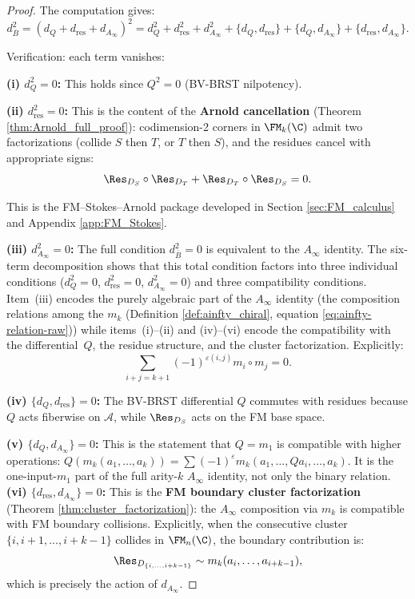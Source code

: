 \begin{proof}
The computation gives:
\begin{equation}
d_{\overline{B}}^2 = (d_Q + d_{\text{res}} + d_{A_\infty})^2 = d_Q^2 + d_{\text{res}}^2 + d_{A_\infty}^2 + \{d_Q, d_{\text{res}}\} + \{d_Q, d_{A_\infty}\} + \{d_{\text{res}}, d_{A_\infty}\}.
\end{equation}

Verification: each term vanishes:

\textbf{(i) $d_Q^2 = 0$:} This holds since $Q^2 = 0$ (BV-BRST nilpotency).

\textbf{(ii) $d_{\text{res}}^2 = 0$:} This is the content of the \textbf{Arnold cancellation} (Theorem \ref{thm:Arnold_full_proof}): codimension-2 corners in $\FM_k(\C)$ admit two factorizations (collide $S$ then $T$, or $T$ then $S$), and the residues cancel with appropriate signs:
\begin{equation}
\Res_{D_S} \circ \Res_{D_T} + \Res_{D_T} \circ \Res_{D_S} = 0.
\end{equation}

This is the FM--Stokes--Arnold package developed in Section \ref{sec:FM_calculus} and Appendix \ref{app:FM_Stokes}.

\textbf{(iii) $d_{A_\infty}^2 = 0$:} The full condition $d_{\overline{B}}^2 = 0$ is equivalent to the $A_\infty$ identity. The six-term decomposition shows that this total condition factors into three individual conditions ($d_Q^2 = 0$, $d_{\mathrm{res}}^2 = 0$, $d_{A_\infty}^2 = 0$) and three compatibility conditions. Item~(iii) encodes the purely algebraic part of the $A_\infty$ identity (the composition relations among the $m_k$ (Definition \ref{def:ainfty_chiral}, equation \eqref{eq:ainfty-relation-raw})) while items~(i)--(ii) and (iv)--(vi) encode the compatibility with the differential~$Q$, the residue structure, and the cluster factorization. Explicitly:
\begin{equation}
\sum_{i+j=k+1} (-1)^{\varepsilon(i,j)} m_i \circ m_j = 0.
\end{equation}

\textbf{(iv) $\{d_Q, d_{\text{res}}\} = 0$:} The BV-BRST differential $Q$ commutes with residues because $Q$ acts fiberwise on $\mathcal{A}$, while $\Res_{D_S}$ acts on the FM base space.

\textbf{(v) $\{d_Q, d_{A_\infty}\} = 0$:} This is the statement that $Q = m_1$ is compatible with higher operations: $Q(m_k(a_1, \ldots, a_k)) = \sum (-1)^{\varepsilon} m_k(a_1, \ldots, Qa_i, \ldots, a_k)$. It is the one-input-$m_1$ part of the full arity-$k$ $A_\infty$ identity, not only the binary relation.
\textbf{(vi) $\{d_{\text{res}}, d_{A_\infty}\} = 0$:} This is the \textbf{FM boundary cluster factorization} (Theorem \ref{thm:cluster_factorization}): the $A_\infty$ composition via $m_k$ is compatible with FM boundary collisions. Explicitly, when the consecutive cluster $\{i, i+1, \ldots, i+k-1\}$ collides in $\FM_n(\C)$, the boundary contribution is:
\begin{equation}
\Res_{D_{\{i, \ldots, i+k-1\}}} \sim m_k(a_i, \ldots, a_{i+k-1}),
\end{equation}
which is precisely the action of $d_{A_\infty}$.


\end{proof}
